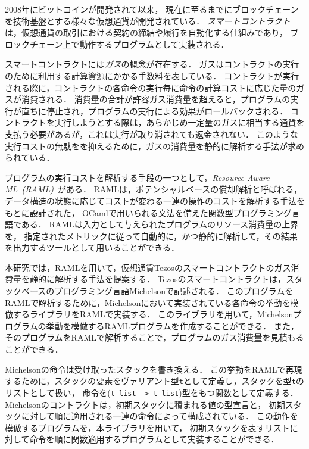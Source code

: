 \documentclass{kuisthesis}
\date{2021年2月2日}
\begin{document}
\maketitle

\begin{jabstract}
2008年にビットコインが開発されて以来，
現在に至るまでにブロックチェーンを技術基盤とする様々な仮想通貨が開発されている．
\emph{スマートコントラクト}は，仮想通貨の取引における契約の締結や履行を自動化する仕組みであり，
ブロックチェーン上で動作するプログラムとして実装される．

スマートコントラクトには\emph{ガス}の概念が存在する．
ガスはコントラクトの実行のために利用する計算資源にかかる手数料を表している．
コントラクトが実行される際に，コントラクトの各命令の実行毎に命令の計算コストに応じた量のガスが消費される．
消費量の合計が許容ガス消費量を超えると，プログラムの実行が直ちに停止され，プログラムの実行による効果がロールバックされる．
コントラクトを実行しようとする際は，あらかじめ一定量のガスに相当する通貨を支払う必要があるが，これは実行が取り消されても返金されない．
このような実行コストの無駄をを抑えるために，ガスの消費量を静的に解析する手法が求められている．

プログラムの実行コストを解析する手段の一つとして，\emph{Resource Aware ML\ (RAML)}\ がある．
RAMLは，ポテンシャルベースの償却解析と呼ばれる，データ構造の状態に応じてコストが変わる一連の操作のコストを解析する手法をもとに設計された，
OCamlで用いられる文法を備えた関数型プログラミング言語である．
RAMLは入力として与えられたプログラムのリソース消費量の上界を，
指定されたメトリックに従って自動的に，かつ静的に解析して，その結果を出力するツールとして用いることができる．

本研究では，RAMLを用いて，仮想通貨Tezosのスマートコントラクトのガス消費量を静的に解析する手法を提案する．
Tezosのスマートコントラクトは，スタックベースのプログラミング言語Michelsonで記述される．
このプログラムをRAMLで解析するために，Michelsonにおいて実装されている各命令の挙動を模倣するライブラリをRAMLで実装する．
このライブラリを用いて，Michelsonプログラムの挙動を模倣するRAMLプログラムを作成することができる．
また，そのプログラムをRAMLで解析することで，プログラムのガス消費量を見積もることができる．

Michelsonの命令は受け取ったスタックを書き換える．
この挙動をRAMLで再現するために，スタックの要素をヴァリアント型{\tt t}として定義し，スタックを型{\tt t}のリストとして扱い，
命令を({\tt t list -> t list})型をもつ関数として定義する．
Michelsonのコントラクトは，初期スタックに積まれる値の型宣言と，
初期スタックに対して順に適用される一連の命令によって構成されている．
この動作を模倣するプログラムを，本ライブラリを用いて，
初期スタックを表すリストに対して命令を順に関数適用するプログラムとして実装することができる．


\end{jabstract}
\end{document}
